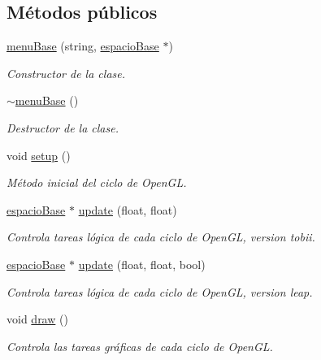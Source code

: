 \subsection*{Métodos públicos}
\begin{DoxyCompactItemize}
\item 
\hyperlink{classmenu_base_a39dcbe65c2af659e4d27da0ec81f5824}{menu\+Base} (string, \hyperlink{classespacio_base}{espacio\+Base} $\ast$)
\begin{DoxyCompactList}\small\item\em Constructor de la clase. \end{DoxyCompactList}\item 
\hyperlink{classmenu_base_a09884cccdb9271476bbf6d87c6acfdfa}{$\sim$menu\+Base} ()
\begin{DoxyCompactList}\small\item\em Destructor de la clase. \end{DoxyCompactList}\item 
void \hyperlink{classmenu_base_a8d6e8078f62721431e095cb50bbcf40e}{setup} ()
\begin{DoxyCompactList}\small\item\em Método inicial del ciclo de Open\+G\+L. \end{DoxyCompactList}\item 
\hyperlink{classespacio_base}{espacio\+Base} $\ast$ \hyperlink{classmenu_base_afd9d5b3caee21605e08f3ccc387715a6}{update} (float, float)
\begin{DoxyCompactList}\small\item\em Controla tareas lógica de cada ciclo de Open\+G\+L, version tobii. \end{DoxyCompactList}\item 
\hyperlink{classespacio_base}{espacio\+Base} $\ast$ \hyperlink{classmenu_base_aff75fb7d3c219571e138d005fea69f9f}{update} (float, float, bool)
\begin{DoxyCompactList}\small\item\em Controla tareas lógica de cada ciclo de Open\+G\+L, version leap. \end{DoxyCompactList}\item 
void \hyperlink{classmenu_base_a0faf0816595b77204dd3e0309b35b76a}{draw} ()
\begin{DoxyCompactList}\small\item\em Controla las tareas gráficas de cada ciclo de Open\+G\+L. \end{DoxyCompactList}\end{DoxyCompactItemize}
